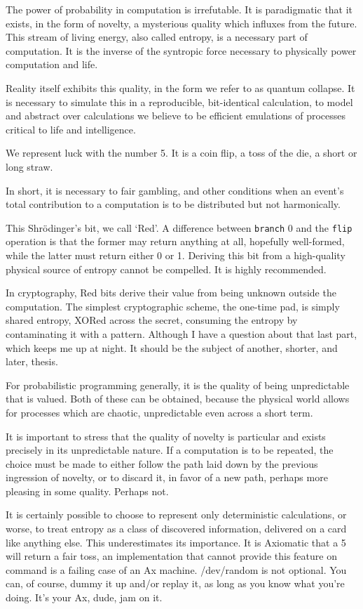 \documentclass[twoside]{article}
\begin{document}
The power of probability in computation is irrefutable. It is paradigmatic that it exists, in the form of novelty, a mysterious quality which influxes from the future. This stream of living energy, also called entropy, is a necessary part of computation. It is the inverse of the syntropic force necessary to physically power computation and life.

Reality itself exhibits this quality, in the form we refer to as quantum collapse. It is necessary to simulate this in a reproducible, bit-identical calculation, to model and abstract over calculations we believe to be efficient emulations of processes critical to life and intelligence.

We represent luck with the number 5. It is a coin flip, a toss of the die, a short or long straw.

In short, it is necessary to fair gambling, and other conditions when an event's total contribution to a computation is to be distributed but not harmonically.

This Shrödinger's bit, we call `Red'. A difference between \texttt{branch} 0 and the \texttt{flip} operation is that the former may return anything at all, hopefully well-formed, while the latter must return either 0 or 1. Deriving this bit from a high-quality physical source of entropy cannot be compelled. It is highly recommended.

In cryptography, Red bits derive their value from being unknown outside the computation. The simplest cryptographic scheme, the one-time pad, is simply shared entropy, XORed across the secret, consuming the entropy by contaminating it with a pattern. Although I have a question about that last part, which keeps me up at night. It should be the subject of another, shorter, and later, thesis.

For probabilistic programming generally, it is the quality of being unpredictable that is valued. Both of these can be obtained, because the physical world allows for processes which are chaotic, unpredictable even across a short term.

It is important to stress that the quality of novelty is particular and exists precisely in its unpredictable nature. If a computation is to be repeated, the choice must be made to either follow the path laid down by the previous ingression of novelty, or to discard it, in favor of a new path, perhaps more pleasing in some quality. Perhaps not.

It is certainly possible to choose to represent only deterministic calculations, or worse, to treat entropy as a class of discovered information, delivered on a card like anything else. This underestimates its importance. It is Axiomatic that a 5 will return a fair toss, an implementation that cannot provide this feature on command is a failing case of an Ax machine. /dev/random is not optional. You can, of course, dummy it up and/or replay it, as long as you know what you're doing. It's your Ax, dude, jam on it.
\end{document}
